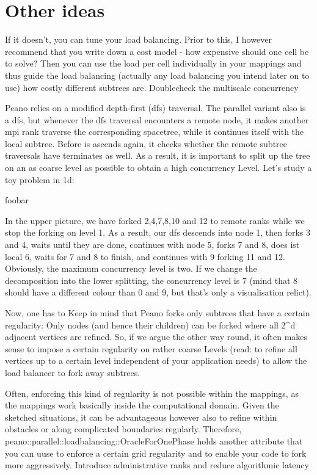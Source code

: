 \section{Other ideas}


If it doesn't, you can tune your load balancing. Prior to this, I however recommend that you write down a cost model - how expensive should one cell be to solve? Then you can use the load per cell individually in your mappings and thus guide the load balancing (actually any load balancing you intend later on to use) how costly different subtrees are.
Doublecheck the multiscale concurrency

Peano relies on a modified depth-first (dfs) traversal. The parallel variant also is a dfs, but whenever the dfs traversal encounters a remote node, it makes another mpi rank traverse the corresponding spacetree, while it continues itself with the local subtree. Before is ascends again, it checks whether the remote subtree traversals have terminates as well. As a result, it is important to split up the tree on an as coarse level as possible to obtain a high concurrency Level. Let's study a toy problem in 1d:

foobar

In the upper picture, we have forked 2,4,7,8,10 and 12 to remote ranks while we stop the forking on level 1. As a result, our dfs descends into node 1, then forks 3 and 4, waits until they are done, continues with node 5, forks 7 and 8, does ist local 6, waits for 7 and 8 to finish, and continues with 9 forking 11 and 12. Obviously, the maximum concurrency level is two. If we change the decomposition into the lower splitting, the concurrency level is 7 (mind that 8 should have a different colour than 0 and 9, but that's only a visualisation relict).

Now, one has to Keep in mind that Peano forks only subtrees that have a certain regularity: Only nodes (and hence their children) can be forked where all 2^d adjacent vertices are refined. So, if we argue the other way round, it often makes sense to impose a certain regularity on rather coarse Levels (read: to refine all vertices up to a certain level independent of your application needs) to allow the load balancer to fork away subtrees.

Often, enforcing this kind of regularity is not possible within the mappings, as the mappings work basically inside the computational domain. Given the sketched situations, it can be advantageous however also to refine within obstacles or along complicated boundaries regularly. Therefore, peano::parallel::loadbalancing::OracleForOnePhase holds another attribute that you can uuse to enforce a certain grid regularity and to enable your code to fork more aggressively.
Introduce administrative ranks and reduce algorithmic latency


